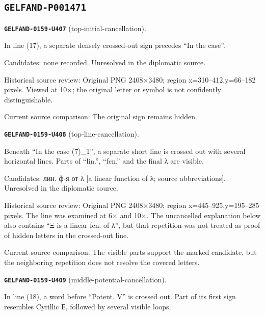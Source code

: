 \subsection*{\texttt{GELFAND-P001471}}
\par\noindent\leavevmode{}\label{GELFAND-0159-U407}\label{GELFAND-P001471:top-initial-cancellation}\textbf{\texttt{GELFAND-0159-U407}} (top-initial-cancellation).\nopagebreak[4]\par
In line (17), a separate densely crossed-out sign precedes “In the case”.\par
Candidates: none recorded. Unresolved in the diplomatic source.\par
Historical source review: Original PNG 2408×3480; region x=310–412,y=66–182 pixels. Viewed at 10×; the original letter or symbol is not confidently distinguishable.\par
Current source comparison: The original sign remains hidden.\par\medskip
\par\noindent\leavevmode{}\label{GELFAND-0159-U408}\label{GELFAND-P001471:top-line-cancellation}\textbf{\texttt{GELFAND-0159-U408}} (top-line-cancellation).\nopagebreak[4]\par
Beneath “In the case (7)\_1”, a separate short line is crossed out with several horizontal lines. Parts of “lin.”, “fcn.” and the final λ are visible.\par
Candidates: лин. ф-я от λ [a linear function of λ; source abbreviations]. Unresolved in the diplomatic source.\par
Historical source review: Original PNG 2408×3480; region x=445–925,y=195–285 pixels. The line was examined at 6× and 10×. The uncancelled explanation below also contains “Ξ is a linear fcn. of λ”, but that repetition was not treated as proof of hidden letters in the crossed-out line.\par
Current source comparison: The visible parts support the marked candidate, but the neighboring repetition does not resolve the covered letters.\par\medskip
\par\noindent\leavevmode{}\label{GELFAND-0159-U409}\label{GELFAND-P001471:middle-potential-cancellation}\textbf{\texttt{GELFAND-0159-U409}} (middle-potential-cancellation).\nopagebreak[4]\par
In line (18), a word before “Potent. V” is crossed out. Part of its first sign resembles Cyrillic Е, followed by several visible loops.\par
